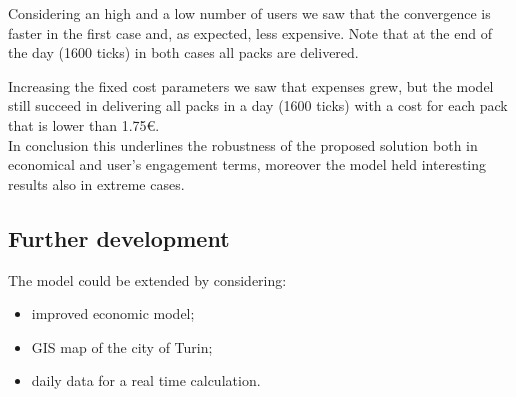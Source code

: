 \documentclass[11pt,a4paper]{article}
\begin{document}
\newpage
Considering an high and a low number of users we saw that the convergence is faster in the first case and, as expected, less expensive. Note that at the end of the day (1600 ticks) in both cases all packs are delivered.


Increasing the fixed cost parameters we saw that expenses grew, but the model still succeed in delivering all packs in a day (1600 ticks) with a cost for each pack that is lower than 1.75\euro{}.
\\
In conclusion this underlines the robustness of the proposed solution both in economical and user's engagement terms, moreover the model held interesting results also in extreme cases. 

\subsection*{Further development}
The model could be extended by considering:
\begin{itemize}
\item improved economic model;
\item GIS map of the city of Turin;
\item daily data for a real time calculation.
\end{itemize}
\end{document}
